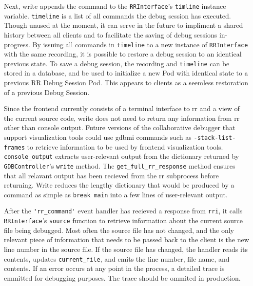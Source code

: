 \documentclass[12pt]{article}
\begin{document}
Next, write appends the command to the \lstinline{RRInterface}'s
\lstinline{timline} instance variable.  \lstinline{timeline} is a list
of all commands the debug session has executed.  Though unused at the
moment, it can serve in the future to impliment a shared history
between all clients and to facilitate the saving of debug sessions
in-progress.  By issuing all commands in \lstinline{timeline} to a new
instance of \lstinline{RRInterface} with the same recording, it is
possible to restore a debug session to an identical previous state.
To save a debug session, the recording and \lstinline{timeline} can be
stored in a database, and be used to initialize a new Pod with
identical state to a previous RR Debug Session Pod.  This appears to
clients as a seemless restoration of a previous Debug Session.
\par

Since the frontend currently consists of a terminal interface to rr
and a view of the current source code, write does not need to return
any information from rr other than console output.  Future versions of
the collaborative debugger that support visualization tools could use
gdbmi commands such as \lstinline{-stack-list-frames} to retrieve
information to be used by frontend visualization tools.
\lstinline{console_output} extracts user-relevant output from the
dictionary returned by \lstinline{GDBController}'s \lstinline{write}
method.  The \lstinline{get_full_rr_response} method ensures that all
relavant output has been recieved from the rr subprocess before
returning.  Write reduces the lengthy dictionary that would be
produced by a command as simple as \lstinline{break main} into a few
lines of user-relevant output.
\par

After the \lstinline{'rr_command'} event handler has recieved a
response from \lstinline{rri}, it calls \lstinline{RRInterface}'s
\lstinline{source} function to retrieve information about the current
source file being debugged.  Most often the source file has not
changed, and the only relevant piece of information that needs to be
passed back to the client is the new line number in the source file.
If the source file has changed, the handler reads its contents,
updates \lstinline{current_file}, and emits the line number, file
name, and contents.  If an error occurs at any point in the process, a
detailed trace is emmitted for debugging purposes.  The trace should
be ommited in production.
\par
\end{document}
